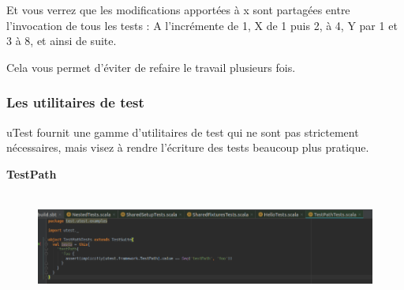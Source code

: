 \documentclass[12pt]{article}
\begin{document}
\begin{itemize}
\par

\begin{justify}
Et vous verrez que les modifications apportées à x sont partagées entre l’invocation de tous les tests : A l'incrémente de 1, X de 1 puis 2, à 4, Y par 1 et 3 à 8, et ainsi de suite.
\end{justify}\par

\begin{justify}
Cela vous permet d'éviter de refaire le travail plusieurs fois.
\end{justify}\par


\end{itemize}\subsubsection{Les utilitaires de test}

\begin{justify}
uTest fournit une gamme d’utilitaires de test qui ne sont pas strictement nécessaires, mais visez à rendre l’écriture des tests beaucoup plus pratique.
\end{justify}\par

\begin{justify}
\textbf{TestPath}
\end{justify}\par




\begin{figure}[H]
	\begin{Center}
		\includegraphics[width=6.3in,height=1.4in]{./media/image13.png}
	\end{Center}
\end{figure}



\par
\end{document}
